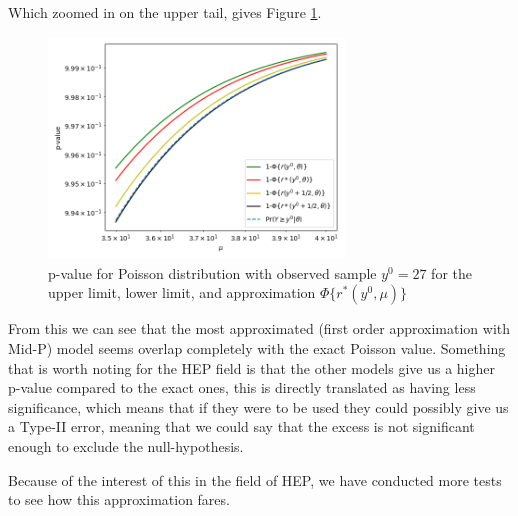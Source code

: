 \documentclass[14pt, a4paper]{article}  %
\begin{document}
Which zoomed in on the upper tail, gives Figure \ref{fig:book_sf_fr_zoom}. \clearpage
\begin{figure}[!ht]
	\centering
        \includegraphics[width=0.7\textwidth]{book_example/book_sig_zoom.png}
	\caption{p-value for Poisson distribution with observed sample $y^0=27$ for the upper limit, lower limit, and approximation $\Phi\{r^*(y^0,\mu)\}$}\label{fig:book_sf_fr_zoom}
\end{figure} 
\noindent From this we can see that the most approximated (first order approximation with Mid-P) model seems overlap completely with the exact Poisson value. Something that is worth noting for the HEP field is that the other models give us a higher p-value compared to the exact ones, this is directly translated as having less significance, which means that if they were to be used they could possibly give us a Type-II error, meaning that we could say that the excess is not significant enough to exclude the null-hypothesis. 

Because of the interest of this in  the field of HEP, we have conducted more tests to see how this approximation fares.
\end{document}
